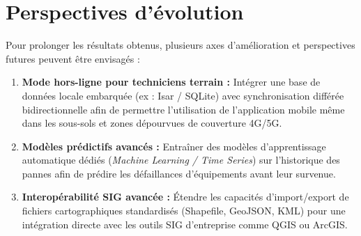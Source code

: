 \section*{Perspectives d'\'evolution}
Pour prolonger les r\'esultats obtenus, plusieurs axes d'am\'elioration et perspectives futures peuvent \^etre envisag\'es :
\begin{enumerate}
    \item \textbf{Mode hors-ligne pour techniciens terrain :} Int\'egrer une base de donn\'ees locale embarqu\'ee (ex : Isar / SQLite) avec synchronisation diff\'er\'ee bidirectionnelle afin de permettre l'utilisation de l'application mobile m\^eme dans les sous-sols et zones d\'epourvues de couverture 4G/5G.
    \item \textbf{Mod\`eles pr\'edictifs avanc\'es :} Entra\^iner des mod\`eles d'apprentissage automatique d\'edi\'es (\textit{Machine Learning / Time Series}) sur l'historique des pannes afin de pr\'edire les d\'efaillances d'\'equipements avant leur survenue.
    \item \textbf{Interop\'erabilit\'e SIG avanc\'ee :} \'Etendre les capacit\'es d'import/export de fichiers cartographiques standardis\'es (Shapefile, GeoJSON, KML) pour une int\'egration directe avec les outils SIG d'entreprise comme QGIS ou ArcGIS.
\end{enumerate}
